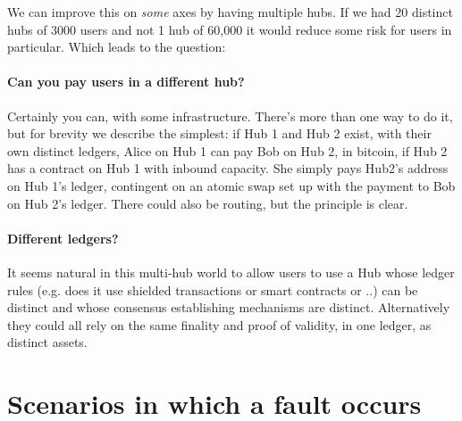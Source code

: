 \documentclass[11pt]{article}
\begin{document}
We can improve this on \emph{some} axes by having multiple hubs. If we had 20 distinct hubs of 3000 users and not 1 hub of 60,000 it would reduce some risk for users in particular. Which leads to the question:

\paragraph{ Can you pay users in a different hub?} Certainly you can, with some infrastructure. There's more than one way to do it, but for brevity we describe the simplest: if Hub 1 and Hub 2 exist, with their own distinct ledgers, Alice on Hub 1 can pay Bob on Hub 2, in bitcoin, if Hub 2 has a contract on Hub 1 with inbound capacity. She simply pays Hub2's address on Hub 1's ledger, contingent on an atomic swap set up with the payment to Bob on Hub 2's ledger. There could also be routing, but the principle is clear.

\paragraph{Different ledgers?} It seems natural in this multi-hub world to allow users to use a Hub whose ledger rules (e.g. does it use shielded transactions or smart contracts or ..) can be distinct and whose consensus establishing mechanisms are distinct. Alternatively they could all rely on the same finality and proof of validity, in one ledger, as distinct assets.

\section{Scenarios in which a fault occurs}
\end{document}
